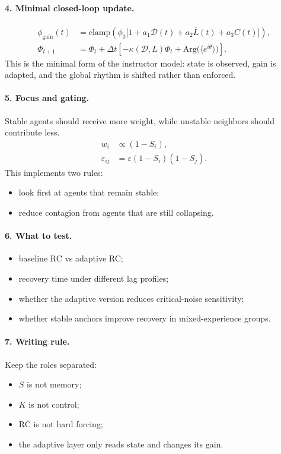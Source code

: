 \paragraph{4. Minimal closed-loop update.}
\begin{align}
\phi_{\mathrm{gain}}(t) &= \mathrm{clamp}\!\left(\phi_0\bigl[1+a_1\mathcal{D}(t)+a_2\overline{L}(t)+a_3 C(t)\bigr]\right), \\
\Phi_{t+1} &= \Phi_t + \Delta t\left[-\kappa(\mathcal{D},L)\Phi_t + \mathrm{Arg}\bigl(\langle e^{i\theta}\rangle\bigr)\right].
\end{align}
This is the minimal form of the instructor model: state is observed, gain is adapted, and the global rhythm is shifted rather than enforced.

\paragraph{5. Focus and gating.}
Stable agents should receive more weight, while unstable neighbors should contribute less.
\begin{align}
w_i &\propto (1-S_i), \\
\varepsilon_{ij} &= \varepsilon(1-S_i)(1-S_j).
\end{align}
This implements two rules:
\begin{itemize}
    \item look first at agents that remain stable;
    \item reduce contagion from agents that are still collapsing.
\end{itemize}

\paragraph{6. What to test.}
\begin{itemize}
    \item baseline RC vs adaptive RC;
    \item recovery time under different lag profiles;
    \item whether the adaptive version reduces critical-noise sensitivity;
    \item whether stable anchors improve recovery in mixed-experience groups.
\end{itemize}

\paragraph{7. Writing rule.}
Keep the roles separated:
\begin{itemize}
    \item $S$ is not memory;
    \item $K$ is not control;
    \item RC is not hard forcing;
    \item the adaptive layer only reads state and changes its gain.
\end{itemize}

